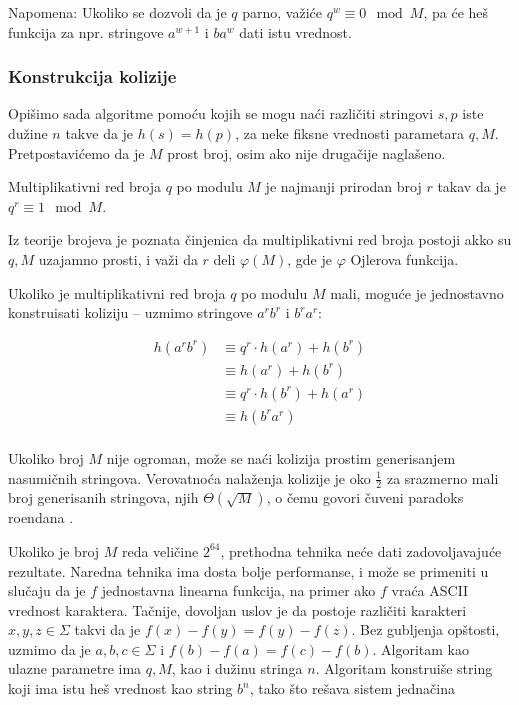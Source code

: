 Napomena: Ukoliko se dozvoli da je $q$ parno, va\v zi\' ce $q^w \equiv 0 \mod M$, pa \' ce he\v s funkcija za npr. stringove $a^{w+1}$ i $ba^{w}$ dati istu vrednost.

\subsubsection{Konstrukcija kolizije}

Opi\v simo sada algoritme pomo\' cu kojih se mogu na\' ci razli\v citi stringovi $s,p$ iste du\v zine $n$ takve da je $h(s) = h(p)$, za neke fiksne vrednosti parametara $q,M$. Pretpostavi\' cemo da je $M$ prost broj, osim ako nije druga\v cije nagla\v seno.

\begin{dfn}
Multiplikativni red broja $q$ po modulu $M$ je najmanji prirodan broj $r$ takav da je $q^r \equiv 1 \mod M$.
\end{dfn}

Iz teorije brojeva je poznata \v cinjenica da multiplikativni red broja postoji akko su $q,M$ uzajamno prosti, i va\v zi da $r$ deli $\varphi(M)$, gde je $\varphi$ Ojlerova funkcija.

Ukoliko je multiplikativni red broja $q$ po modulu $M$ mali, mogu\' ce je jednostavno konstruisati koliziju -- uzmimo stringove $a^rb^r$ i $b^ra^r$:

\begin{align*}
h(a^rb^r) & \equiv q^r \cdot h(a^r) + h(b^r) \\
          & \equiv h(a^r) + h(b^r) \\
          & \equiv q^r \cdot h(b^r) + h(a^r) \\
          & \equiv h(b^ra^r) \\
\end{align*}

Ukoliko broj $M$ nije ogroman, mo\v ze se na\' ci kolizija prostim generisanjem nasumi\v cnih stringova. Verovatno\' ca nala\v zenja kolizije je oko $\frac12$ za srazmerno mali broj generisanih stringova, njih $\Theta(\sqrt M)$, o \v cemu govori \v cuveni paradoks ro\dj endana \cite{birthdayrad}.

\noindent
\begin{minipage}[l]{\textwidth}

\end{minipage}

Ukoliko je broj $M$ reda veli\v cine $2^{64}$, prethodna tehnika ne\' ce dati zadovoljavaju\' ce rezultate. Naredna tehnika ima dosta bolje performanse, i mo\v ze se primeniti u slu\v caju da je $f$ jednostavna linearna funkcija, na primer ako $f$ vra\' ca ASCII vrednost karaktera. Ta\v cnije, dovoljan uslov je da postoje razli\v citi karakteri $x,y,z \in \Sigma$ takvi da je $f(x)-f(y) = f(y)-f(z)$. Bez gubljenja op\v stosti, uzmimo da je $a,b,c \in \Sigma$ i $f(b) - f(a) = f(c) - f(b)$. Algoritam kao ulazne parametre ima $q,M$, kao i du\v zinu stringa $n$. Algoritam konstrui\v se string koji ima istu he\v s vrednost kao string $b^n$, tako \v sto re\v sava sistem jedna\v cina

